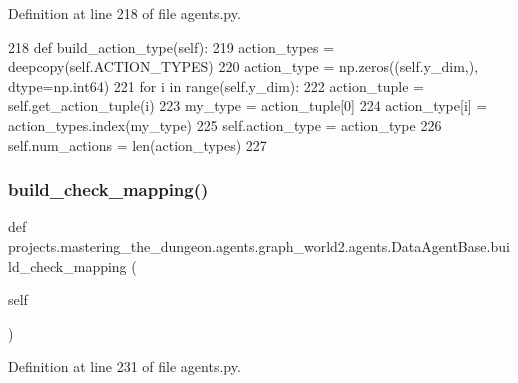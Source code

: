 Definition at line 218 of file agents.\+py.


\begin{DoxyCode}
218     \textcolor{keyword}{def }build\_action\_type(self):
219         action\_types = deepcopy(self.ACTION\_TYPES)
220         action\_type = np.zeros((self.y\_dim,), dtype=np.int64)
221         \textcolor{keywordflow}{for} i \textcolor{keywordflow}{in} range(self.y\_dim):
222             action\_tuple = self.get\_action\_tuple(i)
223             my\_type = action\_tuple[0]
224             action\_type[i] = action\_types.index(my\_type)
225         self.action\_type = action\_type
226         self.num\_actions = len(action\_types)
227 
\end{DoxyCode}
\mbox{\label{classprojects_1_1mastering__the__dungeon_1_1agents_1_1graph__world2_1_1agents_1_1DataAgentBase_a82b184af4dfd53b9d204bb57e980dd78}} 
\subsubsection{\texorpdfstring{build\+\_\+check\+\_\+mapping()}{build\_check\_mapping()}}
{\footnotesize\ttfamily def projects.\+mastering\+\_\+the\+\_\+dungeon.\+agents.\+graph\+\_\+world2.\+agents.\+Data\+Agent\+Base.\+build\+\_\+check\+\_\+mapping (\begin{DoxyParamCaption}\item[{}]{self }\end{DoxyParamCaption})}



Definition at line 231 of file agents.\+py.


